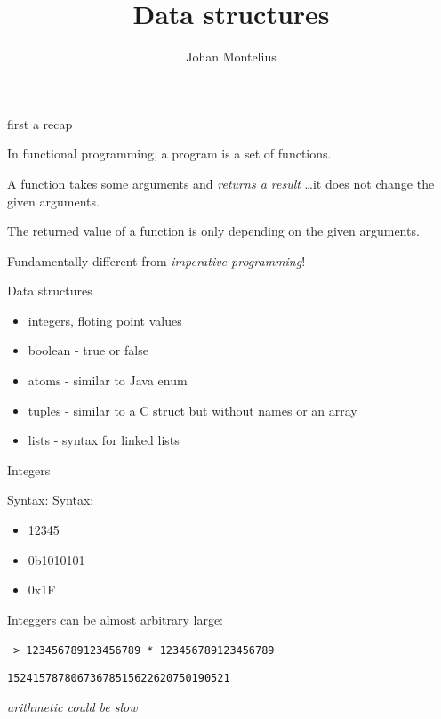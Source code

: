 

\title[ID1019 Data structures]{Data structures}


\author{Johan Montelius}
\date{\semester}



\begin{frame}
\titlepage
\end{frame}

\begin{frame}{first a recap}

\pause In functional programming, a program is a set of functions.

\vspace{20pt}\pause A function takes some arguments and {\em returns a result} \ldots it does not change the given arguments.

\vspace{20pt}\pause The returned value of a function is only depending on the given arguments.

\vspace{20pt}\pause Fundamentally different from {\em imperative programming}!


\end{frame}


\begin{frame}{Data structures}

  \begin{itemize}
  \item integers, floting point values \pause
  \item boolean - true or false
  \item atoms - similar to Java enum \pause
  \item tuples - similar to a C struct but without names or an array\pause
  \item lists - syntax for linked lists
  \end{itemize}

\end{frame}

\begin{frame}{Integers}

  Syntax:
  Syntax:
  \space{10pt}
  \begin{itemize}
  \item 12345 \pause
  \item 0b1010101 \pause
  \item 0x1F \pause
  \end{itemize}  
  
  Integgers can be almost arbitrary large: \pause

  \vspace{10pt}\
  {\tt > 123456789123456789 * 123456789123456789}\pause

  {\tt 15241578780673678515622620750190521} \pause
  
  \vspace{20pt}\pause
  {\em arithmetic could be slow}
\end{frame}


